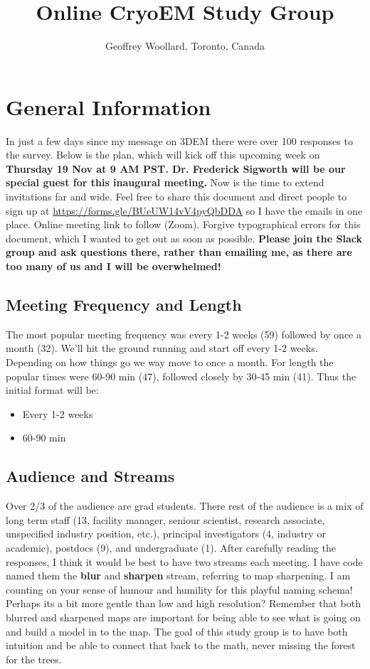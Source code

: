 \documentclass[11pt, oneside]{article}   	%
\title{Online CryoEM Study Group}
\author{Geoffrey Woollard, Toronto, Canada}
\begin{document}
\maketitle

\section{General Information}

In just a few days since my message on 3DEM there were over 100 responses to the survey. Below is the plan, which will kick off this upcoming week on {\bf Thursday 19 Nov at 9 AM PST. Dr. Frederick Sigworth will be our special guest for this inaugural meeting.} Now is the time to extend invitations far and wide. Feel free to share this document and direct people to sign up at \url{https://forms.gle/BUeUW14vV4pyQbDDA} so I have the emails in one place. Online meeting link to follow (Zoom). Forgive typographical errors for this document, which I wanted to get out as soon as possible. {\bf Please join the Slack group and ask questions there, rather than emailing me, as there are too many of us and I will be overwhelmed!}

\subsection{Meeting Frequency and Length}
The most popular meeting frequency was every 1-2 weeks (59) followed by once a month (32). We'll hit the ground running and start off every 1-2 weeks. Depending on how things go we way move to once a month. For length the popular times were 60-90 min (47), followed closely by 30-45 min (41). Thus the initial format will be:
\begin{itemize}
	\item Every 1-2 weeks
	\item 60-90 min
\end{itemize}

\subsection{Audience and Streams}
Over 2/3 of the audience are grad students. There rest of the audience is a mix of long term staff (13, facility manager, seniour scientist, research associate, unspecified industry position, etc.), principal investigators (4, industry or academic), postdocs (9), and undergraduate (1). After carefully reading the responses, I think it would be best to have two streams each meeting. I have code named them the {\bf blur} and {\bf sharpen} stream, referring to map sharpening. I am counting on your sense of humour and humility for this playful naming schema! Perhaps its a bit more gentle than low and high resolution? Remember that both blurred and sharpened maps are important for being able to see what is going on and build a model in to the map. The goal of this study group is to have both intuition and be able to connect that back to the math, never missing the forest for the trees.
\end{document}
